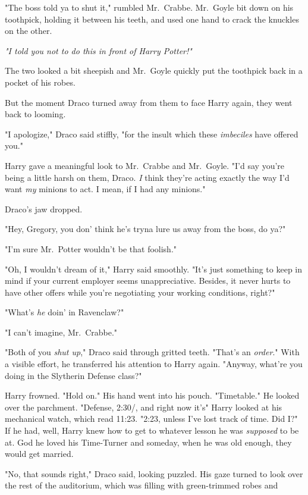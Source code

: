 "The boss told ya to shut it," rumbled Mr.~Crabbe. Mr.~Goyle bit down on his
toothpick, holding it between his teeth, and used one hand to crack the
knuckles on the other.

\emph{"I told you not to do this in front of Harry Potter!"}

The two looked a bit sheepish and Mr.~Goyle quickly put the toothpick back in a
pocket of his robes.

But the moment Draco turned away from them to face Harry again, they went back
to looming.

"I apologize," Draco said stiffly, "for the insult which these \emph{imbeciles}
have offered you."

Harry gave a meaningful look to Mr.~Crabbe and Mr.~Goyle. "I'd say you're being
a little harsh on them, Draco. \emph{I} think they're acting exactly the way
I'd want \emph{my} minions to act. I mean, if I had any minions."

Draco's jaw dropped.

"Hey, Gregory, you don' think he's tryna lure us away from the boss, do ya?"

"I'm sure Mr.~Potter wouldn't be that foolish."

"Oh, I wouldn't dream of it," Harry said smoothly. "It's just something to keep
in mind if your current employer seems unappreciative. Besides, it never hurts
to have other offers while you're negotiating your working conditions, right?"

"What's \emph{he} doin' in Ravenclaw?"

"I can't imagine, Mr.~Crabbe."

"Both of you \emph{shut up}," Draco said through gritted teeth. "That's an
\emph{order}." With a visible effort, he transferred his attention to Harry
again. "Anyway, what're you doing in the Slytherin Defense class?"

Harry frowned. "Hold on." His hand went into his pouch. "Timetable." He looked
over the parchment. "Defense, 2:30\PM/, and right now it's{\el}" Harry looked
at his mechanical watch, which read 11:23. "2:23, unless I've lost track of
time. Did I?" If he had, well, Harry knew how to get to whatever lesson he was
\emph{supposed} to be at. God he loved his Time-Turner and someday, when he was
old enough, they would get married.

"No, that sounds right," Draco said, looking puzzled. His gaze turned to look
over the rest of the auditorium, which was filling with green-trimmed robes
and{\el}

